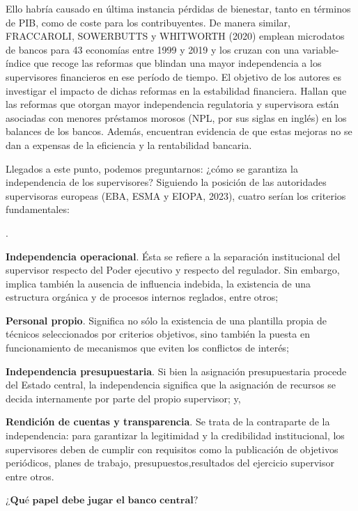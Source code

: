 \documentclass[10pt,a4paper]{article}
\newcounter{numitem}
\newenvironment{lnum}
      {\begin{list}{\arabic{numitem}.}{%
          \usecounter{numitem}%
          \setlength{\leftmargin}{1cm}%
          \setlength{\parskip}{3pt}%
          \setlength{\itemsep}{0pt}%
          \setlength{\parsep}{0pt}%
      }}
      {\end{list}}
\begin{document}
Ello habría causado en última instancia pérdidas de bienestar, tanto en términos de PIB, como de coste para los contribuyentes. De manera similar, FRACCAROLI, SOWERBUTTS y WHITWORTH (2020) emplean microdatos de bancos para 43 economías entre 1999 y 2019 y los cruzan con una variable-índice que recoge las reformas que blindan una mayor independencia a los supervisores financieros en ese período de tiempo. El objetivo de los autores es investigar el impacto de dichas reformas en la estabilidad financiera. Hallan que las reformas que otorgan mayor independencia regulatoria y supervisora están asociadas con menores préstamos morosos (NPL, por sus siglas en inglés) en los balances de los bancos. Además, encuentran evidencia de que estas mejoras no se dan a expensas de la eficiencia y la rentabilidad bancaria. 

Llegados a este punto, podemos preguntarnos: ¿cómo se garantiza la independencia de los supervisores? Siguiendo la posición de las autoridades supervisoras europeas (EBA, ESMA y EIOPA, 2023), cuatro serían los criterios fundamentales:
\begin{lnum}
    \item \textbf{Independencia operacional}. Ésta se refiere a la separación institucional del supervisor respecto del Poder ejecutivo y respecto del regulador. Sin embargo, implica también la ausencia de influencia indebida, la existencia de una estructura orgánica y de procesos internos reglados, entre otros;
    \item \textbf{Personal propio}. Significa no sólo la existencia de una plantilla propia de técnicos seleccionados por criterios objetivos, sino también la puesta en funcionamiento de mecanismos que eviten los conflictos de interés;
    \item \textbf{Independencia presupuestaria}. Si bien la asignación presupuestaria procede del Estado central, la independencia significa que la asignación de recursos se decida internamente por parte del propio supervisor; y,
    \item \textbf{Rendición de cuentas y transparencia}. Se trata de la contraparte de la independencia: para garantizar la legitimidad y la credibilidad institucional, los supervisores deben de cumplir con requisitos como la publicación de objetivos periódicos, planes de trabajo, presupuestos,resultados del ejercicio supervisor entre otros.
\end{lnum}

$\textbf{¿Qué papel debe jugar el banco central?}$
\end{document}
